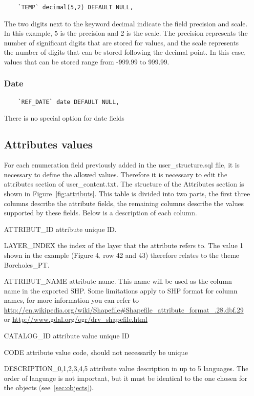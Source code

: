 \documentclass[a4paper, 12pt]{article}
\begin{document}
    \begin{lstlisting}
    `TEMP` decimal(5,2) DEFAULT NULL,
    \end{lstlisting}
    The two digits next to the keyword decimal indicate the field precision and scale. In this example, 5 is the precision and 2 is the scale. The precision represents the number of significant digits that are stored for values, and the scale represents the number of digits that can be stored following the decimal point. In this case, values that can be stored range from -999.99 to 999.99.
    \subsubsection {Date}

    \begin{lstlisting}
    `REF_DATE` date DEFAULT NULL,
    \end{lstlisting}
    There is no special option for date fields


\subsection{Attributes values}
\label{sec:attribute-values}
For each enumeration field previously added in the user\_structure.sql file, it is necessary to define the allowed values. Therefore it is necessary to edit the attributes section of user\_content.txt. The structure of the Attributes section is shown in Figure~\ref{fig:attributs}. This table is divided into two parts, the first three columns describe the attribute fields, the remaining columns describe the values supported by these fields. Below is a description of each column.

\begin{description*}
  \item [ATTRIBUT\_ID] attribute unique ID.
  \item [LAYER\_INDEX] the index of the layer that the attribute refers to. The value 1 shown in the example (Figure 4, row 42 and 43) therefore relates to the theme Boreholes\_PT.
  \item [ATTRIBUT\_NAME] attribute name. This name will be used as the column name in the exported SHP. Some limitations apply to SHP format for column names, for more information you can refer to \url{http://en.wikipedia.org/wiki/Shapefile#Shapefile\_attribute\_format\_.28.dbf.29} or \url{http://www.gdal.org/ogr/drv\_shapefile.html} 
  \item [CATALOG\_ID] attribute value unique ID
  \item [CODE] attribute value code, should not necessarily be unique
  \item [DESCRIPTION\_0,1,2,3,4,5] attribute value description in up to 5 languages. The order of language is not important, but it must be identical to the one chosen for the objects (see~\ref{sec:objects}).

\end{description*}
\end{document}

